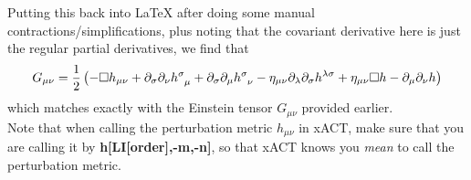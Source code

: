\documentclass{book}
\theoremstyle{definition}
\newcommand{\p}{\partial}
\newcommand{\f}[2]{\frac{#1}{#2}}
\newcommand{\lp}{\left(}
\newcommand{\rp}{\right)}
\begin{document}
Putting this back into \LaTeX{} after doing some manual contractions/simplifications, plus noting that the covariant derivative here is just the regular partial derivatives, we find that
\begin{align}\label{GGG}
G_{\mu\nu} = \f{1}{2}\lp -\square h_{\mu\nu} + \p_\sigma \p_\nu \tensor{h}{^\sigma_\mu}  
+ \p_\sigma \p_\mu \tensor{h}{^\sigma_\nu} 
- \eta_{\mu\nu}\p_\lambda \p_\sigma h^{\lambda\sigma} + \eta_{\mu\nu}\square h - \p_\mu\p_\nu h\rp
\end{align}
which matches exactly with the Einstein tensor $G_{\mu\nu}$ provided earlier.\\


Note that when calling the perturbation metric $h_{\mu\nu}$ in xACT, make sure that you are calling it by \textbf{h[LI[order],-m,-n]}, so that xACT knows you \textit{mean} to call the perturbation metric.\\
\end{document}
